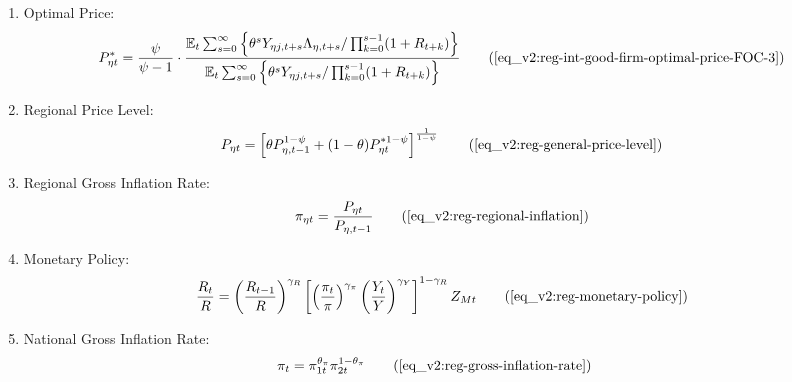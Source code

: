 \documentclass[../thesis.tex]{subfiles}
\begin{document}
{\begin{itemize}
\begin{enumerate}
		\item Optimal Price:
		\begin{align}
			P_{\eta t}^{\ast} = \frac{\psi}{\psi-1} \cdot \frac{ \E \sum_{s=0}^{\infty} \left\{ \theta^s Y_{\eta j,t+s} \Lambda_{\eta, t+s} / \prod_{k=0}^{s-1}(1+R_{t+k}) \right\}} {\E \sum_{s=0}^{\infty} \left\{ \theta^s Y_{\eta j,t+s} / \prod_{k=0}^{s-1}(1 + R_{t+k}) \right\}} \tag{\ref{eq_v2:reg-int-good-firm-optimal-price-FOC-3}}
		\end{align}
		
		\item Regional Price Level:
		\begin{align}
			P_{\eta t} = \left[ \theta P_{\eta,t-1}^{1-\psi} + (1-\theta) P_{\eta t}^{\ast 1-\psi} \right]^\frac{1}{1-\psi} \tag{\ref{eq_v2:reg-general-price-level}}
		\end{align}
		
		\item Regional Gross Inflation Rate:
		\begin{align}
			\pi_{\eta t} = \frac{P_{\eta t}}{P_{\eta, t-1}} \tag{\ref{eq_v2:reg-regional-inflation}}
		\end{align}
		
		\begin{comment}
			\item Intermediate-goods Firms Profit:
			\begin{align}
				\Pi_{\eta t} &= \int_{0}^{1} P_{\eta t} Y_{\eta jt} - W_{\eta t} L_{\eta jt} \dif j \tag{\ref{eq_v2:reg-int-good-firm-profit-total-2}}
			\end{align}	
		\end{comment}
		
		\item Monetary Policy:
		\begin{align}
			\frac{R_{t}}{R} = \left( \frac{R_{t-1}}{R} \right)^{\gamma_{R}} \left[ \left( \frac{\pi_t}{\pi} \right)^{\gamma_{\pi}} \left( \frac{Y_{t}}{Y} \right)^{\gamma_{Y}} \right]^{1-\gamma_{R}} Z_{Mt} \tag{\ref{eq_v2:reg-monetary-policy}}
		\end{align}
		
		\item National Gross Inflation Rate:
		\begin{align}
			\pi_{t} &= \pi_{1t}^{\theta_{\pi}} \pi_{2t}^{1 - \theta_{\pi}} \tag{\ref{eq_v2:reg-gross-inflation-rate}}
		\end{align}
		

\end{enumerate}
\end{itemize}}
\end{document}
